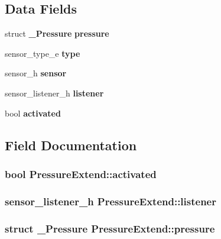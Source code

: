 \subsection*{Data Fields}
\begin{DoxyCompactItemize}
\item 
struct {\bf \-\_\-\-Pressure} {\bfseries pressure}\label{structPressureExtend_aa92934e911c2ec1e63693e339b59e7d8}

\item 
sensor\-\_\-type\-\_\-e {\bfseries type}\label{structPressureExtend_a0b12e9ee1e99b1ddf173d3eeec4483a2}

\item 
sensor\-\_\-h {\bfseries sensor}\label{structPressureExtend_a6183313f63fc129e7e60b13226b1cba5}

\item 
sensor\-\_\-listener\-\_\-h {\bfseries listener}\label{structPressureExtend_a4416595623d073f733331ce49cc26ddb}

\item 
bool {\bfseries activated}\label{structPressureExtend_aafbdbc1980cef191c801ee8c39a38fa5}

\end{DoxyCompactItemize}


\subsection{Field Documentation}
\subsubsection[{activated}]{\setlength{\rightskip}{0pt plus 5cm}bool Pressure\-Extend\-::activated}\label{structPressureExtend_aafbdbc1980cef191c801ee8c39a38fa5}
\subsubsection[{listener}]{\setlength{\rightskip}{0pt plus 5cm}sensor\-\_\-listener\-\_\-h Pressure\-Extend\-::listener}\label{structPressureExtend_a4416595623d073f733331ce49cc26ddb}
\subsubsection[{pressure}]{\setlength{\rightskip}{0pt plus 5cm}struct {\bf \-\_\-\-Pressure} Pressure\-Extend\-::pressure}\label{structPressureExtend_aa92934e911c2ec1e63693e339b59e7d8}

